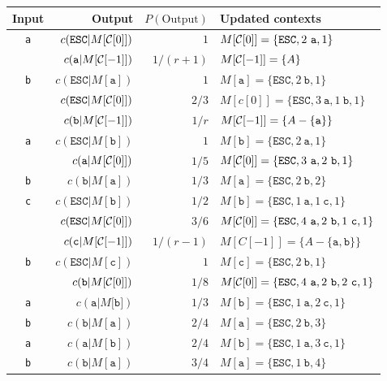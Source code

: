 \documentclass{article}
\begin{document}
\thispagestyle{empty}
\begin{tabular}{crrl}
  Input & Output & $P(\text{Output})$ & Updated contexts\\
  \hline
  {\tt a} & $c(\mathtt{ESC}|M[{\cal C}[0]])$ & $1$ & $M[{\cal C}[0]]=\{\mathtt{ESC},2~\mathtt{a},1\}$\\
  ~ & $c(\mathtt{a}|M[{\cal C}[-1]])$ & $1/(r+1)$ & $M[{\cal C}[-1]]=\{A\}$\\
  {\tt b} & $c(\mathtt{ESC}|M[\texttt{a}])$ & $1$ & $M[\mathtt{a}]=\{\mathtt{ESC},2~\mathtt{b},1\}$\\
  ~ & $c(\mathtt{ESC}|M[{\cal C}[0]])$ & $2/3$ & $M[c[0]]=\{\mathtt{ESC},3~\mathtt{a},1~\mathtt{b},1\}$\\
  ~ & $c(\mathtt{b}|M[{\cal C}[-1]])$ & $1/r$ & $M[{\cal C}[-1]]=\{A-\{\mathtt{a}\}\}$ \\
  {\tt a} & $c(\mathtt{ESC}|M[\texttt{b}])$ & $1$ & $M[\mathtt{b}]=\{\mathtt{ESC},2~\mathtt{a},1\}$\\
 ~ & $c(\mathtt a|M[{\cal C}[0]])$ & $1/5$ & $M[{\cal C}[0]]=\{\mathtt{ESC},3~\mathtt{a},2~\mathtt{b},1\}$\\
  {\tt b} & $c(\mathtt b|M[\mathtt{a}])$ & $1/3$ & $M[\mathtt{a}]=\{\mathtt{ESC},2~\mathtt{b},2\}$\\
  {\tt c} & $c(\mathtt{ESC}|M[\mathtt{b}])$ & $1/2$ & $M[\mathtt{b}]=\{\mathtt{ESC},1~\mathtt{a},1~\mathtt{c},1\}$\\
  ~ & $c(\mathtt{ESC}|M[{\cal C}[0]])$ & $3/6$ & $M[{\cal C}[0]]=\{\mathtt{ESC},4~\mathtt{a},2~\mathtt{b},1~\mathtt{c},1\}$\\
  ~ & $c(\mathtt c|M[{\cal C}[-1]])$ & $1/(r-1)$ & $M[C[-1]]=\{A-\{\mathtt{a},\mathtt{b}\}\}$\\
  {\tt b} & $c(\mathtt{ESC}|M[\texttt{c}])$ & $1$ & $M[\mathtt{c}]=\{\mathtt{ESC},2~\mathtt{b},1\}$\\
  ~ & $c(\mathtt b|M[{\cal C}[0]])$ & $1/8$ & $M[{\cal C}[0]]=\{\mathtt{ESC},4~\mathtt{a},2~\mathtt{b},2~\mathtt{c},1\}$\\
  {\tt a} & $c(\mathtt a|M[\mathtt{b]})$ & $1/3$ & $M[\mathtt{b}]=\{\mathtt{ESC},1~\mathtt{a},2~\mathtt{c},1\}$\\
  {\tt b} & $c(\mathtt b|M[\mathtt{a}])$ & $2/4$ & $M[\mathtt{a}]=\{\mathtt{ESC},2~\mathtt{b},3\}$\\
  {\tt a} & $c(\mathtt a|M[\mathtt{b}])$ & $2/4$ & $M[\mathtt{b}]=\{\mathtt{ESC},1~\mathtt{a},3~\mathtt{c},1\}$\\
  {\tt b} & $c(\mathtt b|M[\mathtt{a}])$ & $3/4$ & $M[\mathtt{a}]=\{\mathtt{ESC},1~\mathtt{b},4\}$\\

\end{tabular}
\end{document}

